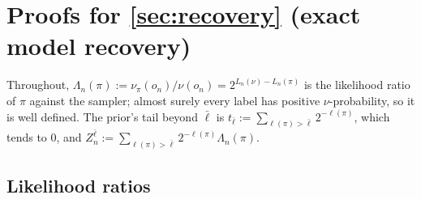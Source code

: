 \section{Proofs for \texorpdfstring{\cref{sec:recovery}}{Section \ref*{sec:recovery}} (exact model recovery)}\label{app:recovery}\label{app:split}

Throughout, $\Lambda_n(\pi):=\nu_\pi(o_n)/\nu(o_n)=2^{L_n(\nu)-L_n(\pi)}$ is the likelihood ratio of $\pi$ against the sampler; almost surely every label has positive $\nu$-probability, so it is well defined. The prior's tail beyond $\bar\ell$ is $t_{\bar\ell}:=\sum_{\ell(\pi)>\bar\ell}2^{-\ell(\pi)}$, which tends to $0$, and $Z^{\bar\ell}_n:=\sum_{\ell(\pi)>\bar\ell}2^{-\ell(\pi)}\Lambda_n(\pi)$.

\subsection{Likelihood ratios}\label{app:recovery:tools}

